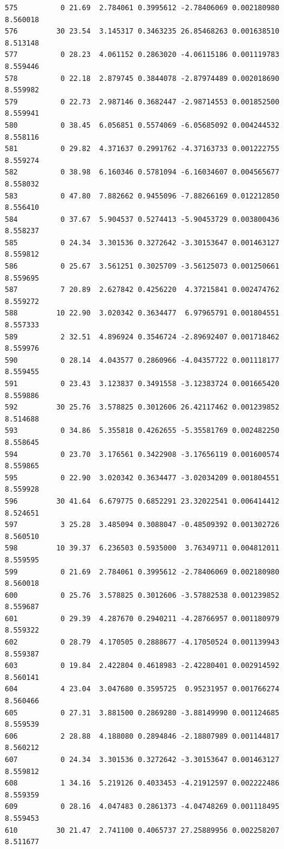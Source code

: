 \documentclass[]{book}
\theoremstyle{definition}
\theoremstyle{definition}
\theoremstyle{definition}
\theoremstyle{remark}
\begin{document}
\begin{verbatim}
575          0 21.69  2.784061 0.3995612 -2.78406069 0.002180980 8.560018
576         30 23.54  3.145317 0.3463235 26.85468263 0.001638510 8.513148
577          0 28.23  4.061152 0.2863020 -4.06115186 0.001119783 8.559446
578          0 22.18  2.879745 0.3844078 -2.87974489 0.002018690 8.559982
579          0 22.73  2.987146 0.3682447 -2.98714553 0.001852500 8.559941
580          0 38.45  6.056851 0.5574069 -6.05685092 0.004244532 8.558116
581          0 29.82  4.371637 0.2991762 -4.37163733 0.001222755 8.559274
582          0 38.98  6.160346 0.5781094 -6.16034607 0.004565677 8.558032
583          0 47.80  7.882662 0.9455096 -7.88266169 0.012212850 8.556410
584          0 37.67  5.904537 0.5274413 -5.90453729 0.003800436 8.558237
585          0 24.34  3.301536 0.3272642 -3.30153647 0.001463127 8.559812
586          0 25.67  3.561251 0.3025709 -3.56125073 0.001250661 8.559695
587          7 20.89  2.627842 0.4256220  4.37215841 0.002474762 8.559272
588         10 22.90  3.020342 0.3634477  6.97965791 0.001804551 8.557333
589          2 32.51  4.896924 0.3546724 -2.89692407 0.001718462 8.559976
590          0 28.14  4.043577 0.2860966 -4.04357722 0.001118177 8.559455
591          0 23.43  3.123837 0.3491558 -3.12383724 0.001665420 8.559886
592         30 25.76  3.578825 0.3012606 26.42117462 0.001239852 8.514688
593          0 34.86  5.355818 0.4262655 -5.35581769 0.002482250 8.558645
594          0 23.70  3.176561 0.3422908 -3.17656119 0.001600574 8.559865
595          0 22.90  3.020342 0.3634477 -3.02034209 0.001804551 8.559928
596         30 41.64  6.679775 0.6852291 23.32022541 0.006414412 8.524651
597          3 25.28  3.485094 0.3088047 -0.48509392 0.001302726 8.560510
598         10 39.37  6.236503 0.5935000  3.76349711 0.004812011 8.559595
599          0 21.69  2.784061 0.3995612 -2.78406069 0.002180980 8.560018
600          0 25.76  3.578825 0.3012606 -3.57882538 0.001239852 8.559687
601          0 29.39  4.287670 0.2940211 -4.28766957 0.001180979 8.559322
602          0 28.79  4.170505 0.2888677 -4.17050524 0.001139943 8.559387
603          0 19.84  2.422804 0.4618983 -2.42280401 0.002914592 8.560141
604          4 23.04  3.047680 0.3595725  0.95231957 0.001766274 8.560466
605          0 27.31  3.881500 0.2869280 -3.88149990 0.001124685 8.559539
606          2 28.88  4.188080 0.2894846 -2.18807989 0.001144817 8.560212
607          0 24.34  3.301536 0.3272642 -3.30153647 0.001463127 8.559812
608          1 34.16  5.219126 0.4033453 -4.21912597 0.002222486 8.559359
609          0 28.16  4.047483 0.2861373 -4.04748269 0.001118495 8.559453
610         30 21.47  2.741100 0.4065737 27.25889956 0.002258207 8.511677

\end{verbatim}
\end{document}
